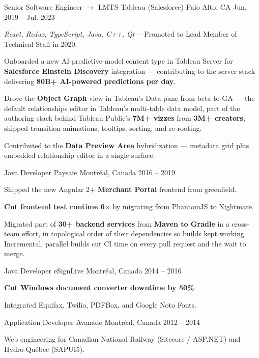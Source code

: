 \documentclass[11pt, letterpaper]{awesome-cv}
\begin{document}
\begin{cventries}
  \cventry
    {Senior Software Engineer $\rightarrow$ LMTS}
    {Tableau (Salesforce)}
    {Palo Alto, CA}
    {Jun. 2019 -- Jul. 2023}
    {
      \begin{cvitems}
        \item {\textit{React, Redux, TypeScript, Java, C++, Qt} \quad---\quad Promoted to Lead Member of Technical Staff in 2020.}
        \item {Onboarded a new AI-predictive-model content type in Tableau Server for \textbf{Salesforce Einstein Discovery} integration --- contributing to the server stack delivering \textbf{80B+ AI-powered predictions per day}.}
        \item {Drove the \textbf{Object Graph} view in Tableau's Data pane from beta to GA --- the default relationships editor in Tableau's multi-table data model, part of the authoring stack behind Tableau Public's \textbf{7M+ vizzes} from \textbf{3M+ creators}; shipped transition animations, tooltips, sorting, and re-rooting.}
        \item {Contributed to the \textbf{Data Preview Area} hybridization --- metadata grid plus embedded relationship editor in a single surface.}
      \end{cvitems}
    }

  \cventry
    {Java Developer}
    {Paysafe}
    {Montréal, Canada}
    {2016 -- 2019}
    {
      \begin{cvitems}
        \item {Shipped the new Angular 2+ \textbf{Merchant Portal} frontend from greenfield.}
        \item {\textbf{Cut frontend test runtime 6$\times$} by migrating from PhantomJS to Nightmare.}
        \item {Migrated part of \textbf{30+ backend services} from \textbf{Maven to Gradle} in a cross-team effort, in topological order of their dependencies so builds kept working. Incremental, parallel builds cut CI time on every pull request and the wait to merge.}
      \end{cvitems}
    }

  \cventry
    {Java Developer}
    {eSignLive}
    {Montréal, Canada}
    {2014 -- 2016}
    {
      \begin{cvitems}
        \item {\textbf{Cut Windows document converter downtime by 50\%}.}
        \item {Integrated Equifax, Twilio, PDFBox, and Google Noto Fonts.}
      \end{cvitems}
    }

  \cventry
    {Application Developer}
    {Avanade}
    {Montréal, Canada}
    {2012 -- 2014}
    {
      \begin{cvitems}
        \item {Web engineering for Canadian National Railway (Sitecore / ASP.NET) and Hydro-Québec (SAPUI5).}
      \end{cvitems}
    }

\end{cventries}
\end{document}
